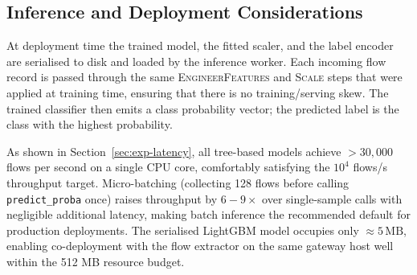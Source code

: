 \subsection{Inference and Deployment Considerations}
\label{sec:inference}

At deployment time the trained model, the fitted scaler, and the label encoder are serialised to disk and loaded by the inference worker. Each incoming flow record is passed through the same \textsc{EngineerFeatures} and \textsc{Scale} steps that were applied at training time, ensuring that there is no training/serving skew. The trained classifier then emits a class probability vector; the predicted label is the class with the highest probability.

As shown in Section~\ref{sec:exp-latency}, all tree-based models achieve $> 30{,}000$ flows per second on a single CPU core, comfortably satisfying the $10^4$ flows/s throughput target. Micro-batching (collecting 128 flows before calling \texttt{predict\_proba} once) raises throughput by $6{-}9\times$ over single-sample calls with negligible additional latency, making batch inference the recommended default for production deployments. The serialised LightGBM model occupies only $\approx 5\,\text{MB}$, enabling co-deployment with the flow extractor on the same gateway host well within the 512 MB resource budget.
